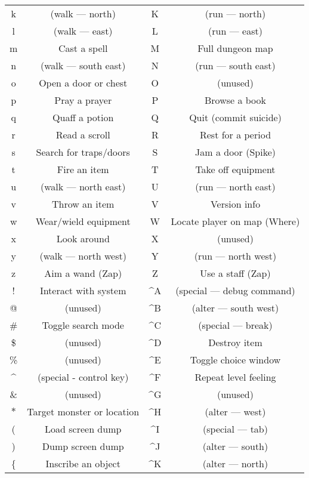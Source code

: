 \paragraph{}
\begin{tabular}{cc|cc}
k & (walk --- north) & K & (run --- north)\\
l & (walk --- east) & L & (run --- east)\\
m & Cast a spell & M & Full dungeon map\\
n & (walk --- south east) & N & (run --- south east)\\
o & Open a door or chest & O & (unused)\\
p & Pray a prayer & P & Browse a book\\
q & Quaff a potion & Q & Quit (commit suicide)\\
r & Read a scroll & R & Rest for a period\\
s & Search for traps/doors & S & Jam a door (Spike)\\
t & Fire an item & T & Take off equipment\\
u & (walk --- north east) & U & (run --- north east)\\
v & Throw an item & V & Version info\\
w & Wear/wield equipment & W & Locate player on map (Where)\\
x & Look around & X & (unused)\\
y & (walk --- north west) & Y & (run --- north west)\\
z & Aim a wand (Zap) & Z & Use a staff (Zap)\\
! & Interact with system & \^{}A & (special --- debug command)\\
@ & (unused) & \^{}B & (alter --- south west)\\
\# & Toggle search mode & \^{}C & (special --- break)\\
\$ & (unused) & \^{}D & Destroy item\\
\% & (unused) & \^{}E & Toggle choice window\\
\^{} & (special - control key) & \^{}F & Repeat level feeling\\
\& & (unused) & \^{}G & (unused)\\
$\ast$ & Target monster or location & \^{}H & (alter --- west)\\
( & Load screen dump & \^{}I & (special --- tab)\\
) & Dump screen dump & \^{}J & (alter --- south)\\
\{ & Inscribe an object & \^{}K & (alter --- north)\\

\end{tabular}
